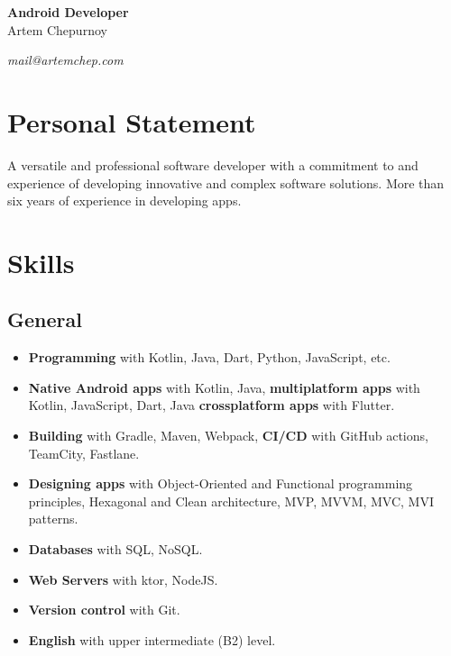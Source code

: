 \documentclass[a4paper]{article}
\begin{document}
	\begin{center}
		{\huge\bfseries Android Developer} \\[1em]
		{\Large Artem Chepurnoy} \\[1em]
		\faMapMarker \quad \myaddress
	\end{center}
	\vspace{1em}
	\textit{\faPaperPlane \quad mail@artemchep.com} \hspace*{\fill} \textit{\faPhone \quad \myphone} 

	\section*{Personal Statement}
	A versatile and professional software developer with a commitment to and experience of developing innovative and complex software solutions. 
	More than six years of experience in developing apps.

	\section*{Skills}
	\subsection*{General}
	\begin{multicols}{2}
	\begin{itemize}
		\item \textbf{Programming} with Kotlin, Java, Dart, Python, JavaScript, etc.
		\item \textbf{Native Android apps} with Kotlin, Java, \textbf{multiplatform apps} with Kotlin, JavaScript, Dart, Java \textbf{crossplatform apps} with Flutter.
		\item \textbf{Building} with Gradle, Maven, Webpack, \textbf{CI/CD} with GitHub actions, TeamCity, Fastlane.
		\item \textbf{Designing apps} with Object-Oriented and Functional programming principles, Hexagonal and Clean architecture, MVP, MVVM, MVC, MVI patterns.
		\item \textbf{Databases} with SQL, NoSQL.
		\item \textbf{Web Servers} with ktor, NodeJS.
		\item \textbf{Version control} with Git.
		\item \textbf{English} with upper intermediate (B2) level.
	\end{itemize}
	\end{multicols}
\end{document}
